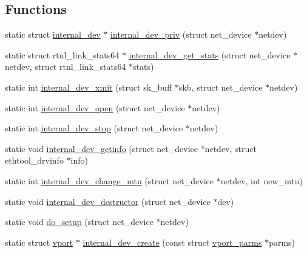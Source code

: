\subsection*{Functions}
\begin{DoxyCompactItemize}
\item 
static struct \hyperlink{structinternal__dev}{internal\+\_\+dev} $\ast$ \hyperlink{linux_2vport-internal__dev_8c_a49d8093032133bbc7c7cd81fa7e541d6}{internal\+\_\+dev\+\_\+priv} (struct net\+\_\+device $\ast$netdev)
\item 
static struct rtnl\+\_\+link\+\_\+stats64 $\ast$ \hyperlink{linux_2vport-internal__dev_8c_a1b51a40ab3a7e2ac5d45d0862de0eecd}{internal\+\_\+dev\+\_\+get\+\_\+stats} (struct net\+\_\+device $\ast$netdev, struct rtnl\+\_\+link\+\_\+stats64 $\ast$stats)
\item 
static int \hyperlink{linux_2vport-internal__dev_8c_aafdf20e45216e64dfb927dbee0da1ec6}{internal\+\_\+dev\+\_\+xmit} (struct sk\+\_\+buff $\ast$skb, struct net\+\_\+device $\ast$netdev)
\item 
static int \hyperlink{linux_2vport-internal__dev_8c_ad76be69f068e92dd73ee48d599a37ee3}{internal\+\_\+dev\+\_\+open} (struct net\+\_\+device $\ast$netdev)
\item 
static int \hyperlink{linux_2vport-internal__dev_8c_ac0b3dbdb4d6a02faeb1b94c46fe1ceb7}{internal\+\_\+dev\+\_\+stop} (struct net\+\_\+device $\ast$netdev)
\item 
static void \hyperlink{linux_2vport-internal__dev_8c_a2b613f99606cc15239007e60575ee5f5}{internal\+\_\+dev\+\_\+getinfo} (struct net\+\_\+device $\ast$netdev, struct ethtool\+\_\+drvinfo $\ast$info)
\item 
static int \hyperlink{linux_2vport-internal__dev_8c_a4a8e78d5216e9cff945747582c010613}{internal\+\_\+dev\+\_\+change\+\_\+mtu} (struct net\+\_\+device $\ast$netdev, int new\+\_\+mtu)
\item 
static void \hyperlink{linux_2vport-internal__dev_8c_ab212be77fdf9605a4f70daf8f3888390}{internal\+\_\+dev\+\_\+destructor} (struct net\+\_\+device $\ast$dev)
\item 
static void \hyperlink{linux_2vport-internal__dev_8c_a63afed52200efd997d360e90a6a8bd11}{do\+\_\+setup} (struct net\+\_\+device $\ast$netdev)
\item 
static struct \hyperlink{structvport}{vport} $\ast$ \hyperlink{linux_2vport-internal__dev_8c_a08ffc4510ebd49d7ffdd031a112a18bb}{internal\+\_\+dev\+\_\+create} (const struct \hyperlink{structvport__parms}{vport\+\_\+parms} $\ast$parms)
\item 

\end{DoxyCompactItemize}
